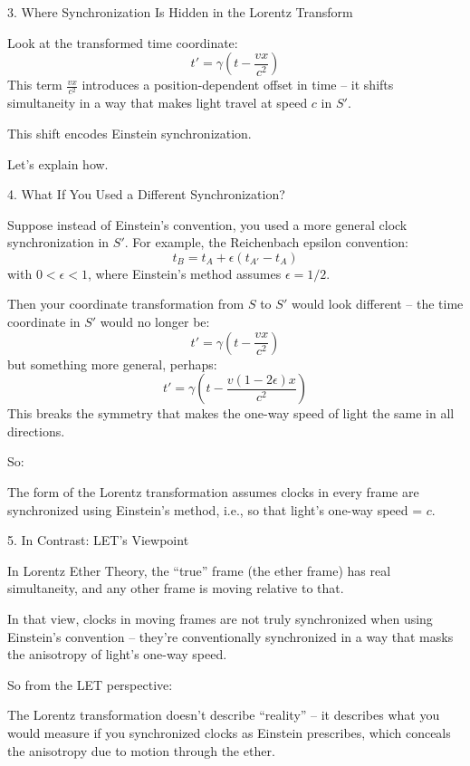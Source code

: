 \documentclass[a4paper]{article}
\theoremstyle{plain}
\theoremstyle{definition}
\begin{document}
3. Where Synchronization Is Hidden in the Lorentz Transform

Look at the transformed time coordinate:
\begin{equation}
t' = \gamma(t - \frac{vx}{c^2})
\end{equation}
This term $\frac{vx}{c^2}$ introduces a position-dependent offset in
time -- it shifts simultaneity in a way that makes light travel at
speed $c$ in $S'$.

This shift encodes Einstein synchronization.

Let's explain how.

4. What If You Used a Different Synchronization?

Suppose instead of Einstein's convention, you used a more general
clock synchronization in $S'$.  For example, the Reichenbach epsilon
convention:
\begin{equation}
t_B = t_A + \epsilon (t_{A'} - t_A)
\end{equation}
with $0 < \epsilon < 1$, where Einstein's method assumes
$\epsilon = 1/2$.

Then your coordinate transformation from $S$ to $S'$ would look
different -- the time coordinate in $S'$ would no longer be:
\begin{equation}
t' = \gamma (t - \frac{vx}{c^2})
\end{equation}
but something more general, perhaps:
\begin{equation}
t' = \gamma (t - \frac{v (1 - 2\epsilon) x}{c^2})
\end{equation}
This breaks the symmetry that makes the one-way speed of light the
same in all directions.

So:

The form of the Lorentz transformation assumes clocks in every frame
are synchronized using Einstein’s method, i.e., so that light’s
one-way speed = $c$.

5. In Contrast: LET's Viewpoint

In Lorentz Ether Theory, the ``true'' frame (the ether frame) has real
simultaneity, and any other frame is moving relative to that.

In that view, clocks in moving frames are not truly synchronized when
using Einstein's convention -- they're conventionally synchronized in
a way that masks the anisotropy of light's one-way speed.

So from the LET perspective:

The Lorentz transformation doesn't describe ``reality'' -- it
describes what you would measure if you synchronized clocks as
Einstein prescribes, which conceals the anisotropy due to motion
through the ether.
\end{document}
